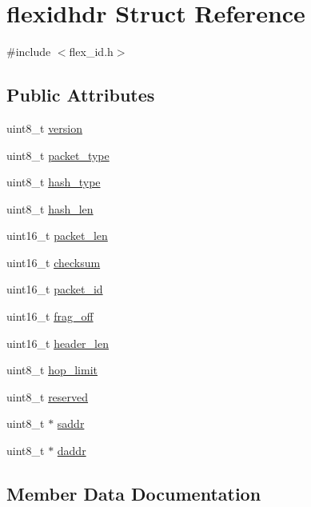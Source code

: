\hypertarget{structflexidhdr}{}\section{flexidhdr Struct Reference}
\label{structflexidhdr}


{\ttfamily \#include $<$flex\+\_\+id.\+h$>$}

\subsection*{Public Attributes}
\begin{DoxyCompactItemize}
\item 
uint8\+\_\+t \hyperlink{structflexidhdr_a040648453cb452e600995d86a1432264}{version}
\item 
uint8\+\_\+t \hyperlink{structflexidhdr_a0d1be6716bc037d0742bb7905c554b7d}{packet\+\_\+type}
\item 
uint8\+\_\+t \hyperlink{structflexidhdr_a4664d30de167966734c63a9602aa67d8}{hash\+\_\+type}
\item 
uint8\+\_\+t \hyperlink{structflexidhdr_ac0e058519cc822eb3cb525217bda557f}{hash\+\_\+len}
\item 
uint16\+\_\+t \hyperlink{structflexidhdr_a25cbbee361b8bff5511611a5f72cff57}{packet\+\_\+len}
\item 
uint16\+\_\+t \hyperlink{structflexidhdr_ae1825703c47432515e7eddb823e3489f}{checksum}
\item 
uint16\+\_\+t \hyperlink{structflexidhdr_a1fc7a84deb9e0042941f7c983f240691}{packet\+\_\+id}
\item 
uint16\+\_\+t \hyperlink{structflexidhdr_a7aa77d8aec125c11801198ca617e5ebe}{frag\+\_\+off}
\item 
uint16\+\_\+t \hyperlink{structflexidhdr_a1e5f6919e501e8aef925b4d78095ea06}{header\+\_\+len}
\item 
uint8\+\_\+t \hyperlink{structflexidhdr_a507914601558d094837046884f9b4d79}{hop\+\_\+limit}
\item 
uint8\+\_\+t \hyperlink{structflexidhdr_a79659668b865b2f14a1e5ac5e6ee63d5}{reserved}
\item 
uint8\+\_\+t $\ast$ \hyperlink{structflexidhdr_ae5f70fa4b298c9ff8fd8ac56d94f52ab}{saddr}
\item 
uint8\+\_\+t $\ast$ \hyperlink{structflexidhdr_a9eb9cfa99f8f77520244cd96d55145f5}{daddr}
\end{DoxyCompactItemize}


\subsection{Member Data Documentation}
